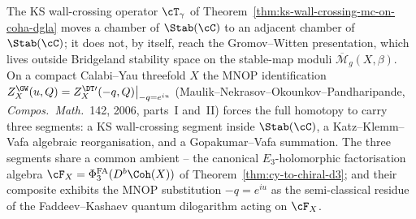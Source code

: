 The KS wall-crossing operator $\cT_\gamma$ of
Theorem~\ref{thm:ks-wall-crossing-mc-on-coha-dgla} moves a chamber of
$\Stab(\cC)$ to an adjacent chamber of $\Stab(\cC)$; it does not, by
itself, reach the Gromov--Witten presentation, which lives outside
Bridgeland stability space on the stable-map moduli
$\overline{\mathcal{M}}_g(X,\beta)$. On a compact Calabi--Yau threefold
$X$ the MNOP identification
$Z^{\GW}_X(u, Q) = Z^{\DT\prime}_X(-q, Q)\big|_{-q = e^{iu}}$
(Maulik--Nekrasov--Okounkov--Pandharipande,
\emph{Compos.~Math.}~142, 2006, parts~I and~II) forces the full
homotopy to carry three segments: a KS wall-crossing segment inside
$\Stab(\cC)$, a Katz--Klemm--Vafa algebraic reorganisation, and a
Gopakumar--Vafa summation. The three segments share a common ambient
-- the canonical $E_3$-holomorphic factorisation algebra
$\cF_X = \PhiFA_3(D^b\Coh(X))$ of
Theorem~\ref{thm:cy-to-chiral-d3}; and their composite exhibits the
MNOP substitution $-q = e^{iu}$ as the semi-classical residue of the
Faddeev--Kashaev quantum dilogarithm acting on $\cF_X$.

